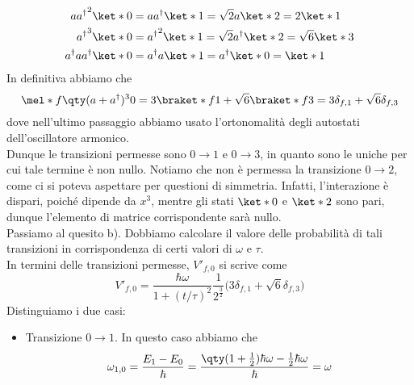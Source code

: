 \begin{soluzione}
\begin{equation*}
      \begin{split}
         a{a^{\dag}}^2 \ket*{0}
         &
         =a a^{\dag} \ket*{1}
         =\sqrt{2} a \ket*{2}
         =2 \ket*{1}
         \\
         {a^{\dag}}^3 \ket*{0}
         &
         ={a^{\dag}}^2 \ket*{1}
         =\sqrt{2} a^{\dag} \ket*{2}
         =\sqrt{6} \ket*{3}
         \\
         a^{\dag} a a^{\dag} \ket*{0}
         &
         =a^{\dag} a \ket*{1}
         =a^{\dag} \ket*{0}
         =\ket*{1}
         \\
      \end{split}
   \end{equation*}
   In definitiva abbiamo che
   \begin{equation*}
      \mel*{f}{\qty( a + a^{\dag} )^3}{0}
      =3\braket*{f}{1} + \sqrt{6} \braket*{f}{3}
      =3 \delta_{f,1} + \sqrt{6} \delta_{f,3}
   \end{equation*}
   dove nell'ultimo passaggio abbiamo usato l'ortonomalità degli autostati dell'oscillatore armonico.\\
   Dunque le transizioni permesse sono $0 \to 1$ e $0 \to 3$, in quanto sono le uniche per cui tale termine è non nullo. Notiamo che non è permessa la transizione $0 \to 2$, come ci si poteva aspettare per questioni di simmetria. Infatti, l'interazione è dispari, poiché dipende da $x^3$, mentre gli stati $\ket*{0}$ e $\ket*{2}$ sono pari, dunque l'elemento di matrice corrispondente sarà nullo.\\
   Passiamo al quesito b). Dobbiamo calcolare il valore delle probabilità di tali transizioni in corrispondenza di certi valori di $\omega$ e $\tau$.\\
   In termini delle transizioni permesse, $V'_{f,0}$ si scrive come
   \begin{equation*}
      V'_{f,0}
      =\frac{\hbar\omega}{1 + (t/\tau)^2} \frac{1}{2^{\frac{3}{2}}} \bigl( 3 \delta_{f,1} + \sqrt{6} \delta_{f,3} \bigr)
   \end{equation*}
   Distinguiamo i due casi:
   \begin{itemize}[leftmargin=0.5cm]
      \item Transizione $0 \to 1$. In questo caso abbiamo che
      \begin{equation*}
         \omega_{1,0}
         =\frac{E_1 - E_0}{\hbar}
         =\frac{\qty( 1 + \frac{1}{2} ) \hbar\omega - \frac{1}{2} \hbar\omega }{\hbar}
         =\omega
      \end{equation*}

\end{itemize}
\end{soluzione}
